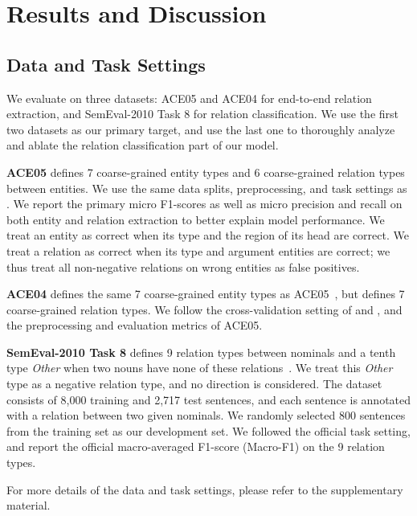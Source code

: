 \documentclass[11pt]{article}
\begin{document}
\section{Results and Discussion}

\subsection{Data and Task Settings}

We evaluate on three datasets:  
ACE05 and ACE04 for end-to-end relation extraction, and SemEval-2010 Task 8 for relation classification. We use the first two datasets as our primary target, and use the last one to thoroughly analyze and ablate the relation classification part of our model. 

{\bf ACE05} defines 7 coarse-grained entity types and 6 coarse-grained relation types between entities. We use the same data splits, preprocessing, and task settings as . 
We report the primary micro F1-scores as well as micro precision and recall on both entity and relation extraction to better explain model performance. 
We treat an entity as correct when its type and the region of its
head are correct. We treat a relation as correct when its type and argument entities are correct; we thus treat all non-negative relations on wrong entities as false positives.

{\bf ACE04} defines the same 7 coarse-grained entity types as ACE05~\cite{doddington:5:2004:lrec2004}, but defines 7 coarse-grained relation types.
We follow the cross-validation setting of  and , and the preprocessing and evaluation metrics of ACE05.

{\bf SemEval-2010 Task 8} defines 9 relation types between nominals and a tenth type {\it Other} when two nouns have none of these relations~\cite{hendrickx-EtAl:2010:SemEval}. We treat this {\it Other} type as a negative relation type, and no direction is considered.
The dataset consists of 8,000 training and 2,717 test sentences, and each sentence is annotated with a relation between two given nominals.
We randomly selected 800 sentences from the training set as our development set. We followed the official task setting, and report the official
macro-averaged F1-score (Macro-F1) on the 9 relation types. 

For more details of the data and task settings, please refer to the supplementary material.
\end{document}
